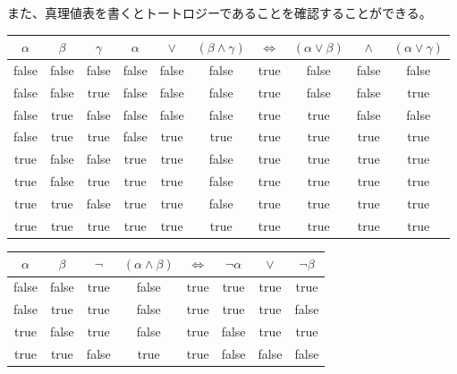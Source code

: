 \documentclass[dvipdfmx]{jsarticle}
\begin{document}
また、真理値表を書くとトートロジーであることを確認することができる。
\begin{table}[H]
  \centering
\begin{tabular}{|c|c|c||c|c|c|c|c|c|c|} \hline
$\alpha$ & $\beta$ & $\gamma$ & $\alpha$ & $\vee$ & $(\beta \wedge \gamma)$ & $\Leftrightarrow$ & $(\alpha \vee \beta)$ & $\wedge$ & $(\alpha \vee \gamma)$ \\ \hline
false    & false   & false    & false    & false  & false                   & true              & false                 & false    & false                  \\ \hline
false    & false   & true     & false    & false  & false                   & true              & false                 & false    & true                   \\ \hline
false    & true    & false    & false    & false  & false                   & true              & true                  & false    & false                  \\ \hline
false    & true    & true     & false    & true   & true                    & true              & true                  & true     & true                   \\ \hline
true     & false   & false    & true     & true   & false                   & true              & true                  & true     & true                   \\ \hline
true     & false   & true     & true     & true   & false                   & true              & true                  & true     & true                   \\ \hline
true     & true    & false    & true     & true   & false                   & true              & true                  & true     & true                   \\ \hline
true     & true    & true     & true     & true   & true                    & true              & true                  & true     & true \\ \hline
\end{tabular}
\end{table}
\begin{table}[H]
  \centering
\begin{tabular}{|cc||cc|c|ccc|} \hline
$\alpha$ & $\beta$ & $\neg$ & $(\alpha \wedge \beta)$ & $\Leftrightarrow$ & $\neg \alpha$ & $\vee$ & $\neg \beta$ \\ \hline
false    & false   & true   & false                   & true              & true          & true   & true         \\ \hline
false    & true    & true   & false                   & true              & true          & true   & false        \\ \hline
true     & false   & true   & false                   & true              & false         & true   & true         \\ \hline
true     & true    & false  & true                    & true              & false         & false  & false \\ \hline
\end{tabular}
\end{table}
\end{document}
